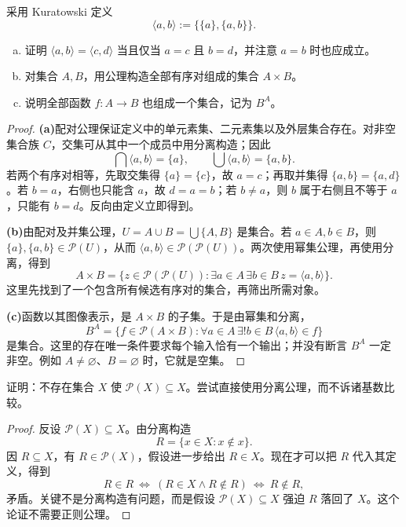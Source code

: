 \documentclass[lang=cn,a4paper,fontset=none,zihao=false,10pt,openany,twoside]{beautybook}
\numberwithin{algorithm}{chapter}
\newcommand{\Pow}{\mathcal P}
\begin{document}
\begin{example}
采用 Kuratowski 定义
\[
 \langle a,b\rangle:=\{\{a\},\{a,b\}\}.
\]
\begin{enumerate}[(a)]
\item 证明 $\langle a,b\rangle=\langle c,d\rangle$ 当且仅当 $a=c$ 且 $b=d$，并注意 $a=b$ 时也应成立。
\item 对集合 $A,B$，用公理构造全部有序对组成的集合 $A\times B$。
\item 说明全部函数 $f:A\to B$ 也组成一个集合，记为 $B^A$。
\end{enumerate}
\end{example}
\begin{proof}
\par\smallskip\noindent\textbf{(a)}\quad 配对公理保证定义中的单元素集、二元素集以及外层集合存在。对非空集合族 $C$，交集可从其中一个成员中用分离构造；因此
\[
 \bigcap\langle a,b\rangle=\{a\},\qquad
 \bigcup\langle a,b\rangle=\{a,b\}.
\]
若两个有序对相等，先取交集得 $\{a\}=\{c\}$，故 $a=c$；再取并集得 $\{a,b\}=\{a,d\}$。若 $b=a$，右侧也只能含 $a$，故 $d=a=b$；若 $b\ne a$，则 $b$ 属于右侧且不等于 $a$，只能有 $b=d$。反向由定义立即得到。

\par\smallskip\noindent\textbf{(b)}\quad 由配对及并集公理，$U=A\cup B=\bigcup\{A,B\}$ 是集合。若 $a\in A,b\in B$，则 $\{a\},\{a,b\}\in\Pow(U)$，从而 $\langle a,b\rangle\in\Pow(\Pow(U))$。两次使用幂集公理，再使用分离，得到
\[
 A\times B=
 \{z\in\Pow(\Pow(U)):\exists a\in A\,\exists b\in B\,
 z=\langle a,b\rangle\}.
\]
这里先找到了一个包含所有候选有序对的集合，再筛出所需对象。

\par\smallskip\noindent\textbf{(c)}\quad 函数以其图像表示，是 $A\times B$ 的子集。于是由幂集和分离，
\[
 B^A=\{f\in\Pow(A\times B):
       \forall a\in A\,\exists!b\in B\,\langle a,b\rangle\in f\}
\]
是集合。这里的存在唯一条件要求每个输入恰有一个输出；并没有断言 $B^A$ 一定非空。例如 $A\ne\varnothing$、$B=\varnothing$ 时，它就是空集。
\end{proof}

\begin{example}[幂集不能包含于原集合]
证明：不存在集合 $X$ 使 $\Pow(X)\subseteq X$。尝试直接使用分离公理，而不诉诸基数比较。
\end{example}
\begin{proof}
反设 $\Pow(X)\subseteq X$。由分离构造
\[
 R=\{x\in X:x\notin x\}.
\]
因 $R\subseteq X$，有 $R\in\Pow(X)$，假设进一步给出 $R\in X$。现在才可以把 $R$ 代入其定义，得到
\[
 R\in R\ \Longleftrightarrow\ (R\in X\wedge R\notin R)
 \ \Longleftrightarrow\ R\notin R,
\]
矛盾。关键不是分离构造有问题，而是假设 $\Pow(X)\subseteq X$ 强迫 $R$ 落回了 $X$。这个论证不需要正则公理。
\end{proof}
\end{document}
